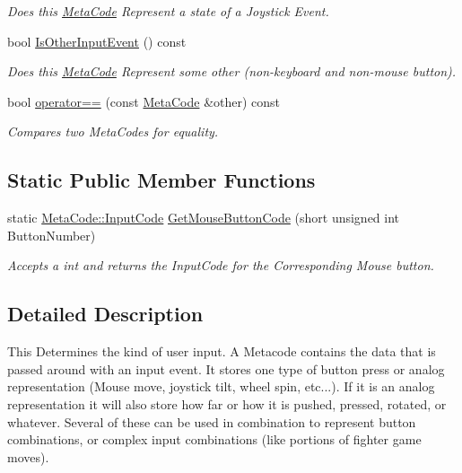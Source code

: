\begin{DoxyCompactItemize}
\begin{DoxyCompactList}\small\item\em Does this \hyperlink{classphys_1_1MetaCode}{MetaCode} Represent a state of a Joystick Event. \item\end{DoxyCompactList}\item 
bool \hyperlink{classphys_1_1MetaCode_a6eb682ae2a56238c6afd3933cb40843b}{IsOtherInputEvent} () const 
\begin{DoxyCompactList}\small\item\em Does this \hyperlink{classphys_1_1MetaCode}{MetaCode} Represent some other (non-\/keyboard and non-\/mouse button). \item\end{DoxyCompactList}\item 
bool \hyperlink{classphys_1_1MetaCode_a506486e5a6f08d50a5af42fa6d48a7f5}{operator==} (const \hyperlink{classphys_1_1MetaCode}{MetaCode} \&other) const 
\begin{DoxyCompactList}\small\item\em Compares two MetaCodes for equality. \item\end{DoxyCompactList}\end{DoxyCompactItemize}
\subsection*{Static Public Member Functions}
\begin{DoxyCompactItemize}
\item 
static \hyperlink{classphys_1_1MetaCode_a3e501cbb5bf0f6f1fdb7211465bda8d8}{MetaCode::InputCode} \hyperlink{classphys_1_1MetaCode_a4c5475be837b3ea5cc66223d53ca3e1a}{GetMouseButtonCode} (short unsigned int ButtonNumber)
\begin{DoxyCompactList}\small\item\em Accepts a int and returns the InputCode for the Corresponding Mouse button. \item\end{DoxyCompactList}\end{DoxyCompactItemize}


\subsection{Detailed Description}
This Determines the kind of user input. A Metacode contains the data that is passed around with an input event. It stores one type of button press or analog representation (Mouse move, joystick tilt, wheel spin, etc...). If it is an analog representation it will also store how far or how it is pushed, pressed, rotated, or whatever. Several of these can be used in combination to represent button combinations, or complex input combinations (like portions of fighter game moves). 

